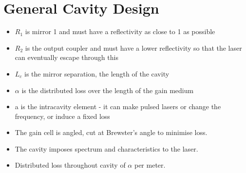 \documentclass[a4paper, 11pt, normalem]{report}
\begin{document}
\section{General Cavity Design}
\begin{figure}[H]
    \centering
\end{figure}
\begin{itemize}
    \item $R_1$ is mirror 1 and must have a reflectivity as close to 1 as possible
    \item $R_2$ is the output coupler and must have a lower reflectivity so that the laser can eventually escape through this
    \item $L_c$ is the mirror separation, the length of the cavity
    \item $\alpha$ is the distributed loss over the length of the gain medium
    \item a is the intracavity element - it can make pulsed lasers or change the frequency, or induce a fixed loss
    \item The gain cell is angled, cut at Brewster's angle to minimise loss. 
    \item The cavity imposes spectrum and characteristics to the laser. 
    \item Distributed loss throughout cavity of $\alpha$ per meter.
\end{itemize}
\end{document}
